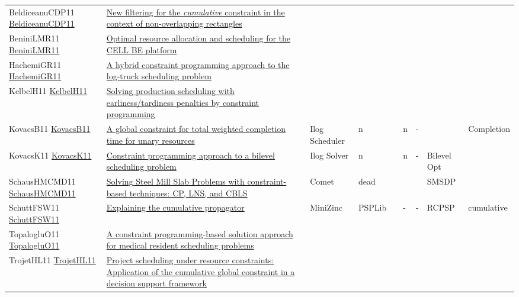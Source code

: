 {\begin{longtable}{p{3cm}p{7cm}lllllll}
BeldiceanuCDP11 \href{https://doi.org/10.1007/s10479-010-0731-0}{BeldiceanuCDP11} &  \href{articles/BeldiceanuCDP11.pdf}{New filtering for the \emph{cumulative} constraint in the context of non-overlapping rectangles} &  &  &  &  &  &  & \\
BeniniLMR11 \href{https://doi.org/10.1007/s10479-010-0718-x}{BeniniLMR11} &  \href{articles/BeniniLMR11.pdf}{Optimal resource allocation and scheduling for the {CELL} {BE} platform} &  &  &  &  &  &  & \\
HachemiGR11 \href{https://doi.org/10.1007/s10479-010-0698-x}{HachemiGR11} &  \href{articles/HachemiGR11.pdf}{A hybrid constraint programming approach to the log-truck scheduling problem} &  &  &  &  &  &  & \\
KelbelH11 \href{https://doi.org/10.1007/s10845-009-0318-2}{KelbelH11} &  \href{articles/KelbelH11.pdf}{Solving production scheduling with earliness/tardiness penalties by constraint programming} &  &  &  &  &  &  & \\
KovacsB11 \href{https://doi.org/10.1007/s10601-009-9088-x}{KovacsB11} &  \href{articles/KovacsB11.pdf}{A global constraint for total weighted completion time for unary resources} & Ilog Scheduler & n &  & n & - &  & Completion\\
KovacsK11 \href{https://doi.org/10.1007/s10601-010-9102-3}{KovacsK11} &  \href{articles/KovacsK11.pdf}{Constraint programming approach to a bilevel scheduling problem} & Ilog Solver & n &  & n & - & Bilevel Opt & \\
SchausHMCMD11 \href{https://doi.org/10.1007/s10601-010-9100-5}{SchausHMCMD11} &  \href{articles/SchausHMCMD11.pdf}{Solving Steel Mill Slab Problems with constraint-based techniques: CP, LNS, and {CBLS}} & Comet & dead &  &  &  & SMSDP & \\
SchuttFSW11 \href{https://doi.org/10.1007/s10601-010-9103-2}{SchuttFSW11} &  \href{articles/SchuttFSW11.pdf}{Explaining the cumulative propagator} & MiniZinc & PSPLib &  & - & - & RCPSP & cumulative\\
TopalogluO11 \href{https://doi.org/10.1016/j.cor.2010.04.018}{TopalogluO11} &  \href{articles/TopalogluO11.pdf}{A constraint programming-based solution approach for medical resident scheduling problems} &  &  &  &  &  &  & \\
TrojetHL11 \href{https://doi.org/10.1016/j.cie.2010.08.014}{TrojetHL11} &  \href{articles/TrojetHL11.pdf}{Project scheduling under resource constraints: Application of the cumulative global constraint in a decision support framework} &  &  &  &  &  &  & \\

\end{longtable}}
